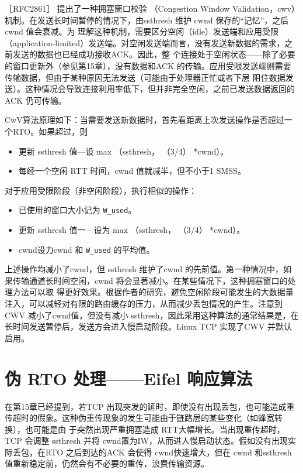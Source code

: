 ［RFC2861］ 提出了一种拥塞窗口校验 （Congestion Window Validation，cwv）机制。在发送长时间暂停的情况下，由ssthresh 维护 cwnd 保存的“记忆”，之后cwnd 值会衰减。为
理解这种机制，需要区分空闲（idle）发送端和应用受限（application-limited）发送端。对空闲发送端而言，没有发送新数据的需求，之前发送的数据也已经成功接收ACK。因此，整
个连接处于空闲状态——除了必要的窗口更新外（参见第15章），没有数据和ACK 的传输。应用受限发送端则需要传输数据，但由于某种原因无法发送（可能由于处理器正忙或者下层
阻住数据发送）。这种情况会导致连接利用率低下，但并非完全空闲，之前已发送数据返回的ACK 仍可传输。

CwV算法原理如下：当需要发送新数据时，首先看距离上次发送操作是否超过一个RTO。如果超过，则

\begin{itemize}
    \item 更新 ssthresh 值—设 max （ssthresh， （3/4） *cwnd）。
    \item 每经一个空闲 RTT 时间，cwnd 值就减半，但不小于1 SMSS。
\end{itemize}
对于应用受限阶段（非空闲阶段），执行相似的操作：
\begin{itemize}
    \item 已使用的窗口大小记为 \verb|W_used|。
    \item 更新 ssthresh 值一—设为 max （ssthresh， （3/4） *cwnd）。
    \item cwnd设力cwnd 和 \verb|W_used| 的平均值。
\end{itemize}

上述操作均减小了cwnd，但 ssthresh 维护了cwnd 的先前值。第一种情况中，如果传输通道长时间空闲，cwnd 将会显著减小。在某些情况下，这种拥塞窗口的处理方法可以取
得更好效果。根据作者的研究，避免空闲阶段可能发生的大数据量注入，可以减轻对有限的路由缓存的压力，从而减少丢包情况的产生。注意到CWV 减小了cwnd值，但没有减小
ssthresh，因此采用这种算法的通常结果是，在长时间发送暂停后，发送方会进入慢启动阶段。Linux TCP 实现了CWV 并默认启用。

\section{伪 RTO 处理——Eifel 响应算法}
在第15章已经提到，若TCP 出现突发的延时，即使没有出现丢包，也可能造成重传超时的假象。这种伪重传现象的发生可能由于链路层的某些变化（如蜂宽转换），也可能是由
于突然出现严重拥塞造成 RTT大幅增长。当出现重传超时，TCP 会调整 ssthresh 并将 cwnd置为IW，从而进人慢启动状态。假如没有出现实际丢包，在RTO 之后到达的ACK 会使得
cwnd快速增大，但在 cwnd 和ssthresh 值重新稳定前，仍然会有不必要的重传，浪费传输资源。

